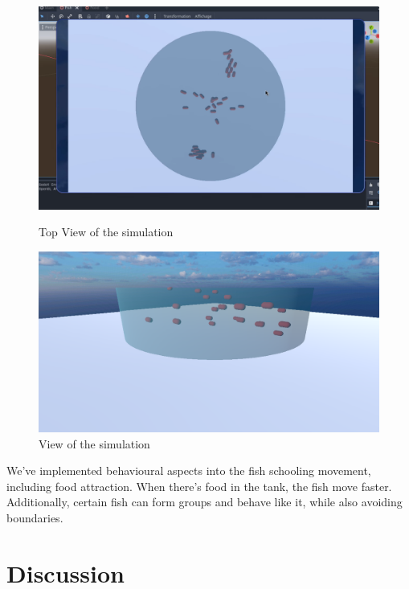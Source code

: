 \documentclass[9pt]{article}
\begin{document}
\begin{figure}[h]
    \centering
    \begin{minipage}[b]{0.45\linewidth}
        \includegraphics[width=\textwidth]{Capture.PNG}
        \caption{Top View of the simulation}
        \label{fig:Top view tankl}
    \end{minipage}
    \hspace{0.5cm}
    \begin{minipage}[b]{0.45\linewidth}
        \includegraphics[width=\textwidth]{poisson2.png}
        \caption{View of the simulation}
        \label{fig: basic view tankl}
    \end{minipage}
\end{figure}

We've implemented behavioural aspects into the fish schooling movement, including food attraction. When there's food in the tank, the fish move faster. Additionally, certain fish can form groups and behave like it, while also avoiding boundaries.



\section{Discussion}
\end{document}
